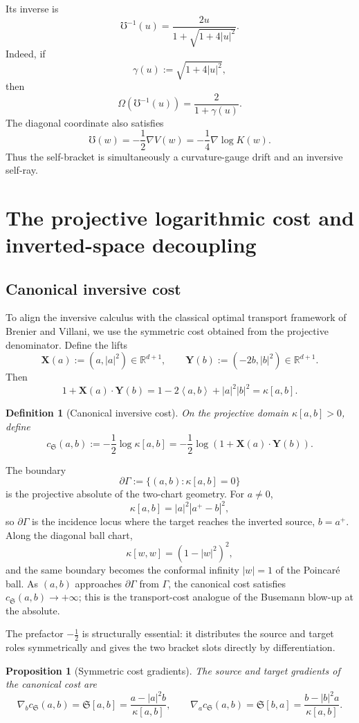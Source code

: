 \documentclass[11pt]{article}
\newtheorem{proposition}[theorem]{Proposition}
\newtheorem{definition}[theorem]{Definition}
\newcommand{\R}{\mathbb{R}}
\newcommand{\ip}[2]{\left\langle #1,#2\right\rangle}
\newcommand{\norm}[1]{\left|#1\right|}
\newcommand{\cs}{c_{\mathfrak S}}
\newcommand{\grad}{\nabla}
\newcommand{\UU}{\mho}
\newcommand{\Sbr}[2]{\mathfrak S[#1,#2]}
\newcommand{\kap}[2]{\kappa[#1,#2]}
\newcommand{\Om}{\Omega}
\newcommand{\Xlift}{\mathbf X}
\newcommand{\Ylift}{\mathbf Y}
\begin{document}
Its inverse is
\[
    \boxed{
    \UU^{-1}(u)=\frac{2u}{1+\sqrt{1+4\norm u^2}}.
    }
\]
Indeed, if
\[
    \gamma(u):=\sqrt{1+4\norm u^2},
\]
then
\[
    \Om(\UU^{-1}(u))=\frac{2}{1+\gamma(u)}.
\]
The diagonal coordinate also satisfies
\[
    \boxed{
    \UU(w)=-\frac12\grad V(w)=-\frac14\grad\log K(w).
    }
\]
Thus the self-bracket is simultaneously a curvature-gauge drift and an inversive self-ray.

\section{The projective logarithmic cost and inverted-space decoupling}

\subsection{Canonical inversive cost}

To align the inversive calculus with the classical optimal transport framework of Brenier and Villani, we use the symmetric cost obtained from the projective denominator.  Define the lifts
\[
    \Xlift(a):=(a,\norm a^2)\in\R^{d+1},
    \qquad
    \Ylift(b):=(-2b,\norm b^2)\in\R^{d+1}.
\]
Then
\[
    1+\Xlift(a)\cdot\Ylift(b)
    =1-2\ip a b+\norm a^2\norm b^2
    =\kap{a}{b}.
\]

\begin{definition}[Canonical inversive cost]
On the projective domain $\kap{a}{b}>0$, define
\[
    \boxed{
    \cs(a,b):=-\frac12\log\kap{a}{b}
    =-\frac12\log(1+\Xlift(a)\cdot\Ylift(b)).
    }
\]
\end{definition}

The boundary
\[
    \partial\Gamma:=\{(a,b):\kap{a}{b}=0\}
\]
is the projective absolute of the two-chart geometry.  For $a\neq0$,
\[
    \kap{a}{b}=\norm a^2\norm{a^+-b}^2,
\]
so $\partial\Gamma$ is the incidence locus where the target reaches the inverted source, $b=a^+$.  Along the diagonal ball chart,
\[
    \kap{w}{w}=(1-\norm w^2)^2,
\]
and the same boundary becomes the conformal infinity $\norm w=1$ of the Poincar\'e ball.  As $(a,b)$ approaches $\partial\Gamma$ from $\Gamma$, the canonical cost satisfies $\cs(a,b)\to+\infty$; this is the transport-cost analogue of the Busemann blow-up at the absolute.

The prefactor $-\frac12$ is structurally essential: it distributes the source and target roles symmetrically and gives the two bracket slots directly by differentiation.

\begin{proposition}[Symmetric cost gradients]
The source and target gradients of the canonical cost are
\[
    \boxed{
    \grad_b\cs(a,b)=\Sbr{a}{b}
    =\frac{a-\norm a^2b}{\kap{a}{b}},
    \qquad
    \grad_a\cs(a,b)=\Sbr{b}{a}
    =\frac{b-\norm b^2a}{\kap{a}{b}}.
    }
\]
\end{proposition}
\end{document}
